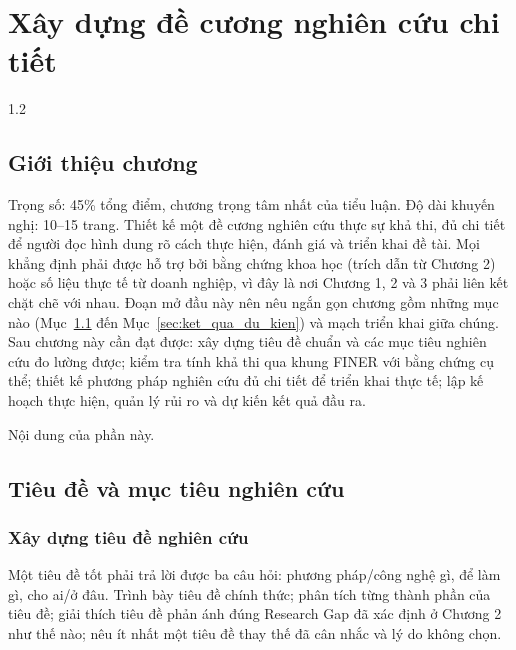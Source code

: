 
\chapter{Xây dựng đề cương nghiên cứu chi tiết}
\label{ch:chuong3}

\begin{spacing}{1.2}

\section*{Giới thiệu chương}

\begin{huongdan}
Trọng số: 45\% tổng điểm, chương trọng tâm nhất của tiểu luận. Độ dài khuyến nghị: 10--15 trang. Thiết kế một đề cương nghiên cứu thực sự khả thi, đủ chi tiết để người đọc hình dung rõ cách thực hiện, đánh giá và triển khai đề tài. Mọi khẳng định phải được hỗ trợ bởi bằng chứng khoa học (trích dẫn từ Chương 2) hoặc số liệu thực tế từ doanh nghiệp, vì đây là nơi Chương 1, 2 và 3 phải liên kết chặt chẽ với nhau. Đoạn mở đầu này nên nêu ngắn gọn chương gồm những mục nào (Mục~\ref{sec:tieu_de_muc_tieu} đến Mục~\ref{sec:ket_qua_du_kien}) và mạch triển khai giữa chúng. Sau chương này cần đạt được: xây dựng tiêu đề chuẩn và các mục tiêu nghiên cứu đo lường được; kiểm tra tính khả thi qua khung FINER với bằng chứng cụ thể; thiết kế phương pháp nghiên cứu đủ chi tiết để triển khai thực tế; lập kế hoạch thực hiện, quản lý rủi ro và dự kiến kết quả đầu ra.
\end{huongdan}

Nội dung của phần này.

\section{Tiêu đề và mục tiêu nghiên cứu}
\label{sec:tieu_de_muc_tieu}

\subsection{Xây dựng tiêu đề nghiên cứu}
\label{subsec:tieu_de}

\begin{huongdan}
Một tiêu đề tốt phải trả lời được ba câu hỏi: phương pháp/công nghệ gì, để làm gì, cho ai/ở đâu. Trình bày tiêu đề chính thức; phân tích từng thành phần của tiêu đề; giải thích tiêu đề phản ánh đúng Research Gap đã xác định ở Chương 2 như thế nào; nêu ít nhất một tiêu đề thay thế đã cân nhắc và lý do không chọn.
\end{huongdan}


\end{spacing}
